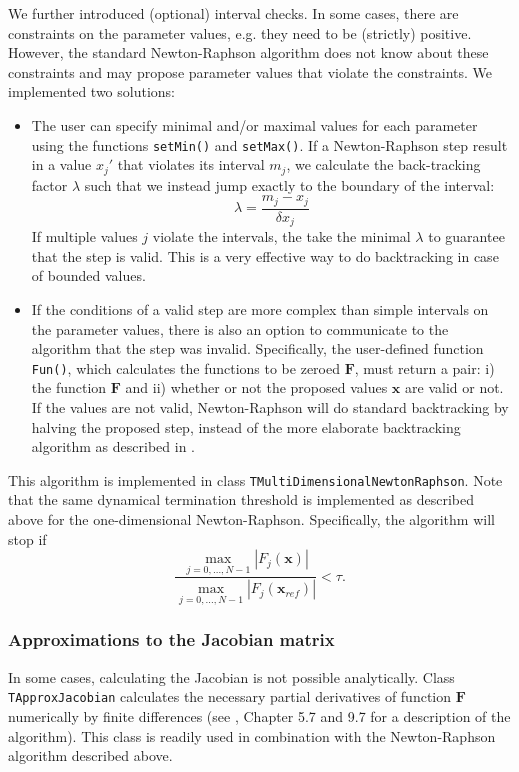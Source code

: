 \documentclass[a4paper,11pt]{article}
\def\F{\boldsymbol{F}}
\def\x{\boldsymbol{x}}
\newcommand{\class}[1]{\texttt{#1}}
\newcommand{\pubfunc}[1]{\texttt{#1()}}
\begin{document}
We further introduced (optional) interval checks. In some cases, there are constraints on the parameter values, e.g. they need to be (strictly) positive. However, the standard Newton-Raphson algorithm does not know about these constraints and may propose parameter values that violate the constraints. We implemented two solutions:
\begin{itemize}
 \item The user can specify minimal and/or maximal values for each parameter using the functions \pubfunc{setMin} and \pubfunc{setMax}. If a Newton-Raphson step result in a value $x_j'$ that violates its interval $m_j$, we calculate the back-tracking factor $\lambda$ such that we instead jump exactly to the boundary of the interval:
 \begin{equation*}
  \lambda = \frac{m_j - x_j}{\delta x_j}
 \end{equation*}
 If multiple values $j$ violate the intervals, the take the minimal $\lambda$ to guarantee that the step is valid. This is a very effective way to do backtracking in case of bounded values.
 \item If the conditions of a valid step are more complex than simple intervals on the parameter values, there is also an option to communicate to the algorithm that the step was invalid. Specifically, the user-defined function \pubfunc{Fun}, which calculates the functions to be zeroed $\F$, must return a pair: i) the function $\F$ and ii) whether or not the proposed values $\x$ are valid or not. If the values are not valid, Newton-Raphson will do standard backtracking by halving the proposed step, instead of the more elaborate backtracking algorithm as described in \citet{Press2007}.
\end{itemize}

This algorithm is implemented in class \class{TMultiDimensionalNewtonRaphson}. Note that the same dynamical termination threshold is implemented as described above for the one-dimensional Newton-Raphson. Specifically, the algorithm will stop if
\begin{equation*}
 \frac{\max_{j=0, \ldots, N-1} |F_j(\x)|}{\max_{j=0, \ldots, N-1} |F_j(\x_{ref})|} < \tau.
\end{equation*}

\subsubsection{Approximations to the Jacobian matrix}
In some cases, calculating the Jacobian is not possible analytically. Class \class{TApproxJacobian} calculates the necessary partial derivatives of function $\F$ numerically by finite differences (see \cite{Press2007}, Chapter 5.7 and 9.7 for a description of the algorithm). This class is readily used in combination with the Newton-Raphson algorithm described above.
\end{document}
